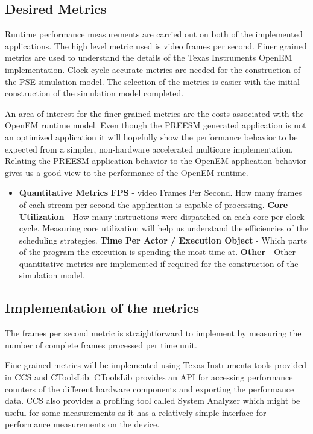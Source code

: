 \subsection{Desired Metrics}
Runtime performance measurements are carried out on both of the implemented applications. The high level metric used is video frames per second. Finer grained metrics are used to understand the details of the Texas Instruments OpenEM implementation. Clock cycle accurate metrics are needed for the construction of the PSE simulation model. The selection of the metrics is easier with the initial construction of the simulation model completed.

An area of interest for the finer grained metrics are the costs associated with the OpenEM runtime model. Even though the PREESM generated application is not an optimized application it will hopefully show the performance behavior to be expected from a simpler, non-hardware accelerated multicore implementation. Relating the PREESM application behavior to the OpenEM application behavior gives us a good view to the performance of the OpenEM runtime.

\begin{itemize}
\item[] \textbf{Quantitative Metrics}
    \subitem \textbf{FPS} - video Frames Per Second. How many frames of each stream per second the application is capable of processing.
    \subitem \textbf{Core Utilization} - How many instructions were dispatched on each core per clock cycle. Measuring core utilization will help us understand the efficiencies of the scheduling strategies.
    \subitem \textbf{Time Per Actor / Execution Object} - Which parts of the program the execution is spending the most time at.
    \subitem \textbf{Other} - Other quantitative metrics are implemented if required for the construction of the simulation model.
\end{itemize}
\subsection{Implementation of the metrics}
The frames per second metric is straightforward to implement by measuring the number of complete frames processed per time unit.

Fine grained metrics will be implemented using Texas Instruments tools provided in CCS and CToolsLib. CToolsLib provides an API for accessing performance counters of the different hardware components and exporting the performance data. CCS also provides a profiling tool called System Analyzer which might be useful for some measurements as it has a relatively simple interface for performance measurements on the device.
